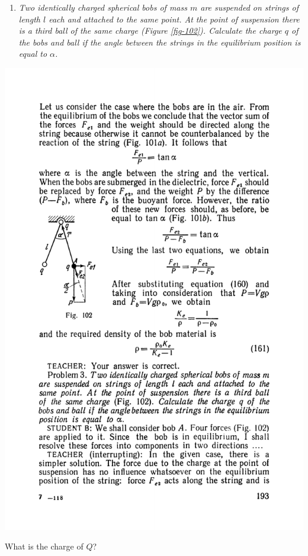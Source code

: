 \documentclass[a4paper,sfsidenotes]{tufte-book}
\begin{document}
\begin{enumerate}[label=Problem \arabic*.,font=\bfseries,resume=p3,leftmargin=*]
\item \emph{Two identically charged spherical bobs of mass $m$ are suspended on strings of length $l$ each and attached to the same point. At the point of suspension there is a third ball of the same charge (\emph{Figure \ref{fig-102}}). Calculate the charge $q$ of the bobs and ball if the angle between the strings in the equilibrium position is equal to $\alpha$.}
\end{enumerate}
\begin{marginfigure}%
\centering
\includegraphics[width=\linewidth]{fig-102a}
\caption{What is the charge of $Q$?}
\label{fig-102}
\end{marginfigure}
\end{document}
